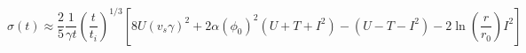 \begin{equation}
\sigma(t) \approx  \frac{2}{5} \frac{1}{\gamma t} 
\left(\frac{t}{t_i}\right)^{1/3} \left[
8U (v_s\gamma)^2 + 2\alpha(\phi_0)^2 \left(U+T+I^2\right)- 
\left( U-T-I^2\right) - 2\ln\left(\frac{r}{r_0}\right)I^2  \right] 
\end{equation}

